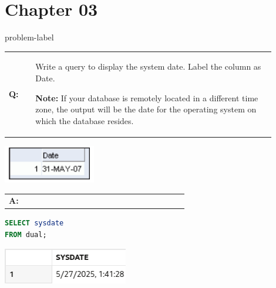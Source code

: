 \newpage
\section*{Chapter 03}
{}
\setcounter{problem}{0}
\begin{problem}{}{problem-label}

\begin{tabular}{@{}l p{0.9\linewidth}@{}}
  \textbf{Q:} & Write a query to display the system date. Label the column as Date.
  
\textbf{Note:} If your database is remotely located in a different time zone, the output will be the date for the operating system on which the database resides.
\end{tabular}

\begin{center}
  \includegraphics[scale=0.8]{images/c3q1.png}
\end{center}


\begin{tabular}{@{}l p{0.9\linewidth}@{}}
  \textbf{A:} & 
\end{tabular}


\begin{lstlisting}[language=SQL]
SELECT sysdate
FROM dual;
\end{lstlisting}


\begin{center}
  \includegraphics[scale=0.8]{images/c3a1.png}
\end{center}

\end{problem}

